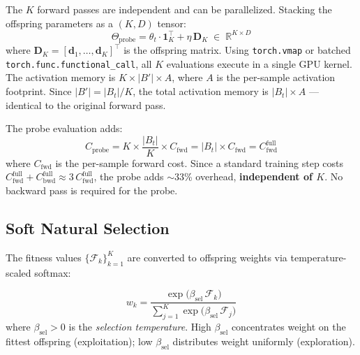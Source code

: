 \documentclass[12pt]{article}
\newcommand{\eqbox}[2]{%
  \begin{tcolorbox}[eqstyle, title={#1}]
    #2
  \end{tcolorbox}
}
\newcommand{\R}{\mathbb{R}}
\begin{document}
The $K$ forward passes are independent and can be parallelized.
Stacking the offspring parameters as a $(K, D)$ tensor:
\begin{equation}
  \Theta_{\mathrm{probe}} = \theta_t \cdot \mathbf{1}_K^\top
    + \eta\,\mathbf{D}_K
  \;\in\; \R^{K \times D}
  \label{eq:probe_stack}
\end{equation}
where $\mathbf{D}_K = [\mathbf{d}_1, \ldots, \mathbf{d}_K]^\top$ is
the offspring matrix.
Using \texttt{torch.vmap} or batched
\texttt{torch.func.functional\_call}, all $K$ evaluations execute in
a single GPU kernel.
The activation memory is $K \times |B'| \times A$, where $A$ is the
per-sample activation footprint.
Since $|B'| = |B_t|/K$, the total activation memory is $|B_t| \times A$
--- identical to the original forward pass.

\eqbox{Proposition 1 \textemdash\ Computational Cost}{
The probe evaluation adds:
\begin{equation}
  C_{\mathrm{probe}} = K \times \frac{|B_t|}{K} \times C_{\mathrm{fwd}}
  = |B_t| \times C_{\mathrm{fwd}}
  = C_{\mathrm{fwd}}^{\mathrm{full}}
  \label{eq:probe_cost}
\end{equation}
\smallskip
where $C_{\mathrm{fwd}}$ is the per-sample forward cost.
Since a standard training step costs
$C_{\mathrm{fwd}}^{\mathrm{full}} + C_{\mathrm{bwd}}^{\mathrm{full}}
\approx 3\,C_{\mathrm{fwd}}^{\mathrm{full}}$,
the probe adds $\sim$33\% overhead, \textbf{independent of $K$}.
No backward pass is required for the probe.
}


\subsection{Soft Natural Selection}
\label{ssec:selection}

The fitness values $\{\mathcal{F}_k\}_{k=1}^K$ are converted to
offspring weights via temperature-scaled softmax:

\eqbox{Definition 3 \textemdash\ Offspring Selection Weights}{
\begin{equation}
  w_k = \frac{
    \exp\!\bigl(\beta_{\mathrm{sel}}\,\mathcal{F}_k\bigr)
  }{
    \sum_{j=1}^{K}
    \exp\!\bigl(\beta_{\mathrm{sel}}\,\mathcal{F}_j\bigr)
  }
  \label{eq:selection_weights}
\end{equation}
\smallskip
where $\beta_{\mathrm{sel}} > 0$ is the \emph{selection temperature}.
High $\beta_{\mathrm{sel}}$ concentrates weight on the fittest offspring
(exploitation); low $\beta_{\mathrm{sel}}$ distributes weight uniformly
(exploration).
}
\end{document}

